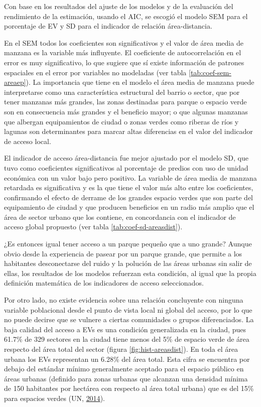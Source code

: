 \documentclass[12pt,a4paper,openany]{book}
\theoremstyle{definition}
\theoremstyle{definition}
\theoremstyle{definition}
\theoremstyle{remark}
\begin{document}
Con base en los resultados del ajuste de los modelos y de la evaluación
del rendimiento de la estimación, usando el AIC, se escogió el modelo
SEM para el porcentaje de EV y SD para el indicador de relación
área-distancia.

En el SEM todos los coeficientes son significativos y el valor de área
media de manzana es la variable más influyente. El coeficiente de
autocorrelación en el error es muy significativo, lo que sugiere que sí
existe información de patrones espaciales en el error por variables no
modeladas (ver tabla \ref{tab:coef-sem-areaep}). La importancia que
tiene en el modelo el área media de manzana puede interpretarse como una
característica estructural del barrio o sector, que por tener manzanas
más grandes, las zonas destinadas para parque o espacio verde son en
consecuencia más grandes y el beneficio mayor; o que algunas manzanas
que albergan equipamientos de ciudad o zonas verdes como riberas de ríos
y lagunas son determinantes para marcar altas diferencias en el valor
del indicador de acceso local.

El indicador de acceso área-distancia fue mejor ajustado por el modelo
SD, que tuvo como coeficientes significativos al porcentaje de predios
con uso de unidad económica con un valor bajo pero positivo. La variable
de área media de manzana retardada es significativa y es la que tiene el
valor más alto entre los coeficientes, confirmando el efecto de derrame
de los grandes espacio verdes que son parte del equipamiento de ciudad y
que producen beneficios en un radio más amplio que el área de sector
urbano que los contiene, en concordancia con el indicador de acceso
global propuesto (ver tabla \ref{tab:coef-sd-areasdist}).

¿Es entonces igual tener acceso a un parque pequeño que a uno grande?
Aunque obvio desde la experiencia de pasear por un parque grande, que
permite a los habitantes desconectarse del ruido y la polución de las
áreas urbanas sin salir de ellas, los resultados de los modelos
refuerzan esta condición, al igual que la propia definición matemática
de los indicadores de acceso seleccionados.

Por otro lado, no existe evidencia sobre una relación concluyente con
ninguna variable poblacional desde el punto de vista local ni global del
acceso, por lo que no puede decirse que se vulnere a ciertas comunidades
o grupos diferenciados. La baja calidad del acceso a EVs es una
condición generalizada en la ciudad, pues 61.7\% de 329 sectores en la
ciudad tiene menos del 5\% de espacio verde de área respecto del área
total del sector (figura \ref{fig:hist-areasdist}). En toda el área
urbana los EVs representan un 6.28\% del área total. Esta cifra se
encuentra por debajo del estándar mínimo generalmente aceptado para el
espacio público en áreas urbanas (definido para zonas urbanas que
alcanzan una densidad mínima de 150 habitantes por hectárea con respecto
al área total urbana) que es del 15\% para espacios verdes (UN,
\protect\hyperlink{ref-un2014sdg}{2014}).
\end{document}
